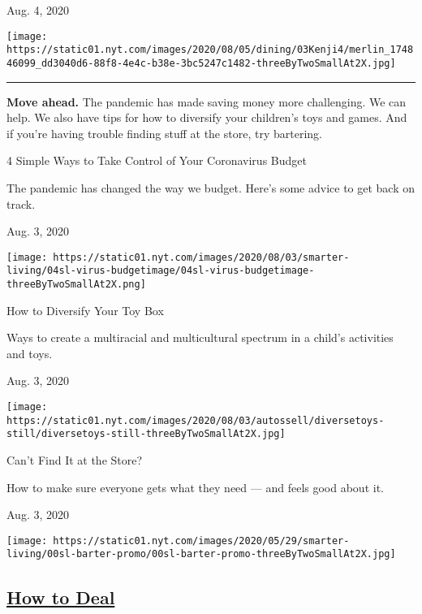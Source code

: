 Aug. 4, 2020

\texttt{[image: https://static01.nyt.com/images/2020/08/05/dining/03Kenji4/merlin\_174846099\_dd3040d6-88f8-4e4c-b38e-3bc5247c1482-threeByTwoSmallAt2X.jpg]}

\begin{center}\rule{0.5\linewidth}{\linethickness}\end{center}

\textbf{Move ahead.} The pandemic has made saving money more
challenging. We can help. We also have tips for how to diversify your
children's toys and games. And if you're having trouble finding stuff at
the store, try bartering.

\href{https://www.nytimes.com/2020/08/03/smarter-living/coronavirus-budget-save-money.html?action=click\&module=RelatedLinks\&pgtype=collection}{}

4 Simple Ways to Take Control of Your Coronavirus Budget

The pandemic has changed the way we budget. Here's some advice to get
back on track.

Aug. 3, 2020

\texttt{[image: https://static01.nyt.com/images/2020/08/03/smarter-living/04sl-virus-budgetimage/04sl-virus-budgetimage-threeByTwoSmallAt2X.png]}

\href{https://www.nytimes.com/2020/08/03/parenting/multiracial-toys-diversity-play.html?action=click\&module=RelatedLinks\&pgtype=collection}{}

How to Diversify Your Toy Box

Ways to create a multiracial and multicultural spectrum in a child's
activities and toys.

Aug. 3, 2020

\texttt{[image: https://static01.nyt.com/images/2020/08/03/autossell/diversetoys-still/diversetoys-still-threeByTwoSmallAt2X.jpg]}

\href{https://www.nytimes.com/2020/08/03/smarter-living/coronavirus-how-to-trade-barter.html?action=click\&module=RelatedLinks\&pgtype=collection}{}

Can't Find It at the Store?

How to make sure everyone gets what they need --- and feels good about
it.

Aug. 3, 2020

\texttt{[image: https://static01.nyt.com/images/2020/05/29/smarter-living/00sl-barter-promo/00sl-barter-promo-threeByTwoSmallAt2X.jpg]}

\hypertarget{how-to-deal}{%
\subsection{\texorpdfstring{\href{/spotlight/how-to-deal}{How to
Deal}}{How to Deal}}\label{how-to-deal}}

